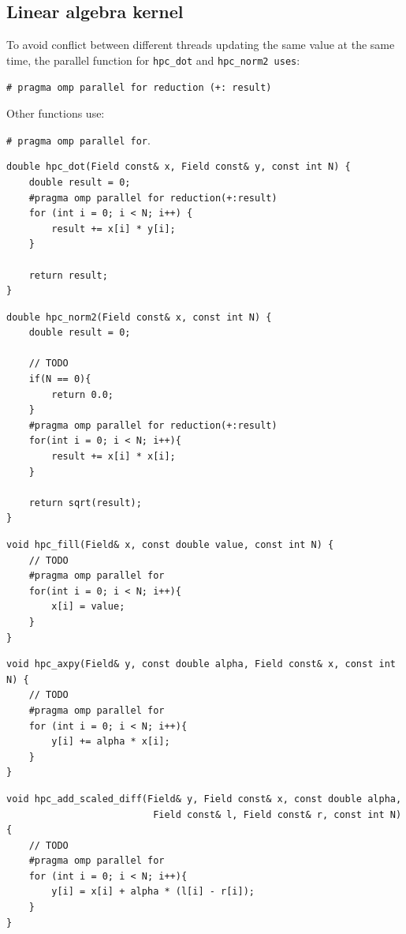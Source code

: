 \documentclass[unicode,11pt,a4paper,oneside,numbers=endperiod,openany]{scrartcl}
\begin{document}
\subsection{Linear algebra kernel}
To avoid conflict between different threads updating the same value at the same time, the parallel function for \texttt{hpc\_dot} and \texttt{hpc\_norm2 uses}:

\texttt{\# pragma omp parallel for reduction (+: result)}

Other functions use:

\texttt{\# pragma omp parallel for}.

\begin{lstlisting}[language=MyC++, style=mystyle, caption={HPC Dot Product Function with Parallelization}]
double hpc_dot(Field const& x, Field const& y, const int N) {
    double result = 0;
    #pragma omp parallel for reduction(+:result)
    for (int i = 0; i < N; i++) {
        result += x[i] * y[i];
    }

    return result;
}
\end{lstlisting}
\begin{lstlisting}[language=MyC++, style=mystyle, caption={HPC Norm Calculation Function with Parallelization}]
double hpc_norm2(Field const& x, const int N) {
    double result = 0;

    // TODO
    if(N == 0){
        return 0.0;
    }
    #pragma omp parallel for reduction(+:result)
    for(int i = 0; i < N; i++){
        result += x[i] * x[i];
    }

    return sqrt(result);
}
\end{lstlisting}
\begin{lstlisting}[language=MyC++, style=mystyle, caption={HPC Fill Function with Parallelization}]
void hpc_fill(Field& x, const double value, const int N) {
    // TODO
    #pragma omp parallel for
    for(int i = 0; i < N; i++){
        x[i] = value;
    }
}
\end{lstlisting}
\begin{lstlisting}[language=MyC++, style=mystyle, caption={HPC AXPY Function with Parallelization}]
void hpc_axpy(Field& y, const double alpha, Field const& x, const int N) {
    // TODO
    #pragma omp parallel for
    for (int i = 0; i < N; i++){
        y[i] += alpha * x[i]; 
    }
}
\end{lstlisting}
\begin{lstlisting}[language=MyC++, style=mystyle, caption={HPC Add Scaled Difference Function with Parallelization}]
void hpc_add_scaled_diff(Field& y, Field const& x, const double alpha,
                          Field const& l, Field const& r, const int N) {
    // TODO
    #pragma omp parallel for
    for (int i = 0; i < N; i++){
        y[i] = x[i] + alpha * (l[i] - r[i]);
    }
}
\end{lstlisting}
\end{document}
